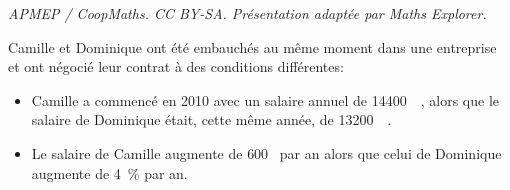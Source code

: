 \documentclass[10pt]{article}
\providecommand{\euro}{\texteuro}
\providecommand{\np}[2][]{{#2~#1}}
\providecommand{\euro}{{\text{€}}}
\renewcommand{\euro}{\ifmmode\text{\texteuro}\else\texteuro\fi}
\begin{document}
\noindent\textit{APMEP / CoopMaths. CC BY-SA. Présentation adaptée par Maths Explorer.}\par\medskip
\medskip

Camille et Dominique ont été embauchés au même moment dans une entreprise et ont négocié leur contrat à des conditions différentes:

\setlength\parindent{10mm}
\begin{itemize}
\item Camille a commencé en 2010 avec un salaire annuel de \np{14400}~\euro, alors que le salaire de Dominique était, cette même année, de \np{13200}~\euro.
\item Le salaire de Camille augmente de $600$~\euro{} par an alors que celui de Dominique augmente de 4 \,\% par an.
\end{itemize}
\setlength\parindent{0mm}

\medskip
\end{document}
